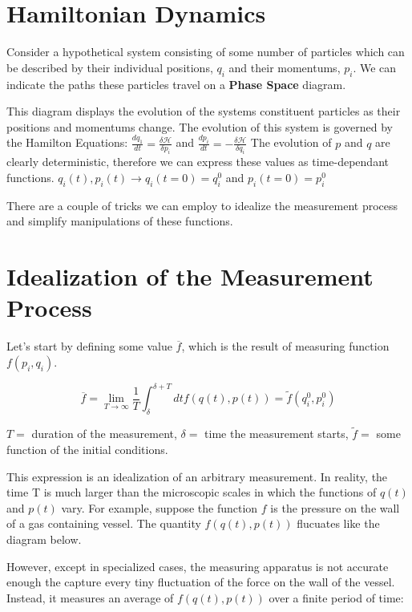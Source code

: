 \documentclass{book}
\newcommand{\pardif}[2]{\frac{\delta#1}{\delta#2}}
\newcommand{\dif}[2]{\frac{d#1}{d#2}}
\begin{document}
\section{Hamiltonian Dynamics}

Consider a hypothetical system consisting of some number of particles which can be described by their individual positions, $q_{i}$ and their momentums, $p_{i}$.  We can indicate the paths these particles travel on a {\bf{Phase Space}} diagram.  


This diagram displays the evolution of the systems constituent particles as their positions and momentums change.  The evolution of this system is governed by the Hamilton Equations:  $\dif{q_{1}}{t} = \pardif{\mathcal{H}}{p_{i}}$ and $\dif{p_{i}}{t}=-\pardif{\mathcal{H}}{q_{i}}$  The evolution of $p$ and $q$ are clearly deterministic, therefore we can express these values as time-dependant functions.  $q_{i}(t), p_{i}(t) \rightarrow q_{i}(t=0)=q_{i}^{0}$ and $p_{i}(t=0)=p_{i}^0$

There are a couple of tricks we can employ to idealize the measurement process and simplify manipulations of these functions.

\section{Idealization of the Measurement Process}

Let's start by defining some value $\overline{f}$, which is the result of measuring function $f(p_{i},q_{i})$.  

$$\overline{f}=\lim_{T\to\infty}\frac{1}{T}\int_{\delta}^{\delta+T}dtf(q(t),p(t))=\widetilde{f}(q_{i}^0,p_{i}^0)$$

$T=$ duration of the measurement, $\delta=$ time the measurement starts, $\widetilde{f}=$ some function of the initial conditions.

This expression is an idealization of an arbitrary measurement.  In reality, the time T is much larger than the microscopic scales in which the functions of $q(t)$ and $p(t)$ vary.  For example, suppose the function $f$ is the pressure on the wall of a gas containing vessel.  The quantity $f(q(t),p(t))$ flucuates like the diagram below.


However, except in specialized cases, the measuring apparatus is not accurate enough the capture every tiny fluctuation of the force on the wall of the vessel.  Instead, it measures an average of $f(q(t),p(t))$ over a finite period of time:
\end{document}
